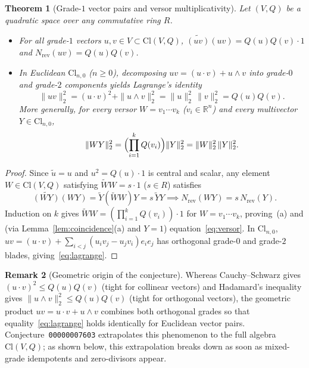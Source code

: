 \documentclass[11pt]{article}
\newtheorem{theorem}{Theorem}[section]
\theoremstyle{definition}
\newtheorem{remark}[theorem]{Remark}
\newcommand{\Cl}{\mathrm{Cl}}
\newcommand{\R}{\mathbb{R}}
\newcommand{\Nrev}{N_{\mathrm{rev}}}
\begin{document}
\begin{theorem}[Grade-$1$ vector pairs and versor multiplicativity]\label{thm:vectors}
Let $(V,Q)$ be a quadratic space over any commutative ring $R$.
\begin{itemize}
  \item[(a)] For all grade-$1$ vectors $u,v\in V\subset\Cl(V,Q)$, $\widetilde{(uv)}(uv)=Q(u)Q(v)\cdot 1$ and $\Nrev(uv)=Q(u)Q(v)$.
  \item[(b)] In Euclidean $\Cl_{n,0}$ ($n\ge 0$), decomposing $uv=(u\cdot v)+u\wedge v$ into grade-$0$ and grade-$2$ components yields Lagrange's identity
  \begin{equation}\label{eq:lagrange}
    \|uv\|_2^2 = (u\cdot v)^2 + \|u\wedge v\|_2^2 = \|u\|_2^2\,\|v\|_2^2 = Q(u)Q(v).
  \end{equation}
  More generally, for every versor $W=v_1\cdots v_k$ ($v_i\in\R^n$) and every multivector $Y\in\Cl_{n,0}$,
  \begin{equation}\label{eq:versor}
    \|WY\|_2^2 = \Bigl(\prod_{i=1}^k Q(v_i)\Bigr)\|Y\|_2^2 = \|W\|_2^2\,\|Y\|_2^2.
  \end{equation}
\end{itemize}
\end{theorem}
\begin{proof}
Since $\widetilde{u}=u$ and $u^2=Q(u)\cdot 1$ is central and scalar, any element $W\in\Cl(V,Q)$ satisfying $\widetilde{W}W=s\cdot 1$ ($s\in R$) satisfies
\[
  \widetilde{(WY)}(WY) = \widetilde{Y}(\widetilde{W}W)Y = s\,\widetilde{Y}Y \implies \Nrev(WY) = s\,\Nrev(Y).
\]
Induction on $k$ gives $\widetilde{W}W=(\prod_{i=1}^k Q(v_i))\cdot 1$ for $W=v_1\cdots v_k$, proving~(a) and (via Lemma~\ref{lem:coincidence}(a) and $Y=1$) equation~\eqref{eq:versor}. In $\Cl_{n,0}$, $uv=(u\cdot v)+\sum_{i<j}(u_iv_j-u_jv_i)e_ie_j$ has orthogonal grade-$0$ and grade-$2$ blades, giving~\eqref{eq:lagrange}.
\end{proof}

\begin{remark}[Geometric origin of the conjecture]
Whereas Cauchy--Schwarz gives $(u\cdot v)^2\le Q(u)Q(v)$ (tight for collinear vectors) and Hadamard's inequality gives $\|u\wedge v\|_2^2\le Q(u)Q(v)$ (tight for orthogonal vectors), the geometric product $uv=u\cdot v+u\wedge v$ combines both orthogonal grades so that equality~\eqref{eq:lagrange} holds identically for Euclidean vector pairs. Conjecture~\texttt{00000007603} extrapolates this phenomenon to the full algebra $\Cl(V,Q)$; as shown below, this extrapolation breaks down as soon as mixed-grade idempotents and zero-divisors appear.
\end{remark}
\end{document}
